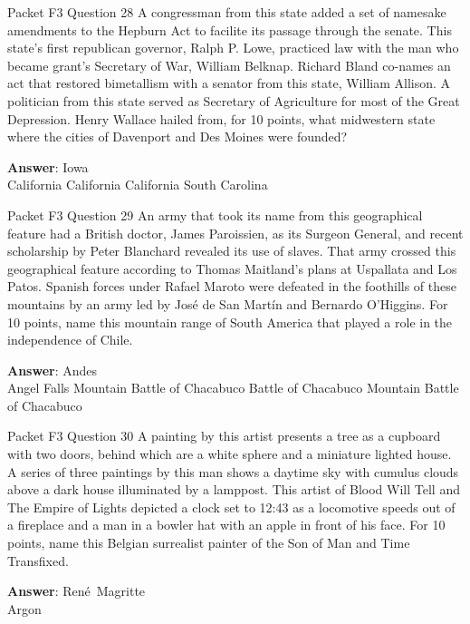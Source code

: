 \begin{frame}{Packet F3 Question 28}
A congressman from this state added a set   of namesake amendments to the Hepburn Act to facilite its passage through the senate. This state’s first republican governor, Ralph P. Lowe, practiced law with the man who became grant’s Secretary of War, William Belknap. Richard Bland co-names an act that restored bimetallism with a senator from this state, William Allison. A politician from this state served as Secretary of Agriculture for most of the Great Depression. Henry Wallace hailed from, for 10 points, what midwestern state where the cities of Davenport and Des Moines were founded?        

\textbf{Answer}: Iowa\\
 California
 California
 California
 South Carolina
\end{frame}

\begin{frame}{Packet F3 Question 29}
An army that took its name from this geographical feature had a British doctor, James Paroissien, as its Surgeon General, and recent scholarship by Peter Blanchard revealed its use of slaves. That army crossed this geographical feature according   to Thomas Maitland’s   plans at Uspallata and Los Patos. Spanish forces under Rafael Maroto were defeated in the foothills of these mountains by an army led by José de San Martín and Bernardo O'Higgins.   For 10 points, name this mountain range of South America that played a role   in the independence of Chile.      

\textbf{Answer}: Andes\\
 Angel Falls
 Mountain
 Battle of Chacabuco
 Battle of Chacabuco
 Mountain
 Battle of Chacabuco
\end{frame}

\begin{frame}{Packet F3 Question 30}
A painting by this artist   presents a tree as a cupboard with two doors, behind which are a white sphere and a miniature lighted house. A series of three paintings by this man shows a daytime sky with cumulus clouds above a dark house illuminated by a lamppost. This artist of Blood Will Tell and The Empire of Lights depicted a clock set to 12:43   as a locomotive speeds out of a fireplace and a man in   a bowler hat with an   apple in front of his face. For 10 points, name this Belgian surrealist painter   of the Son of Man and Time Transfixed.

\textbf{Answer}: René\ Magritte\\
 Argon
\end{frame}

